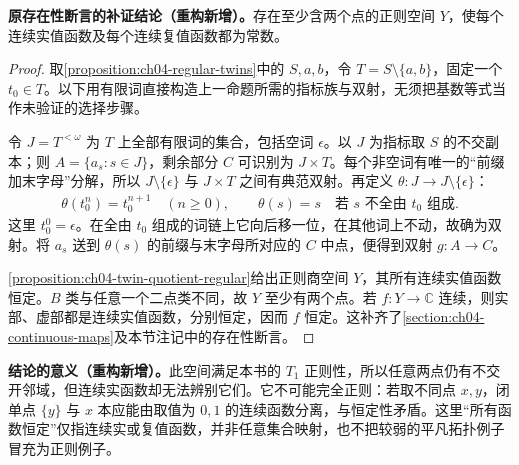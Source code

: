 \documentclass[../../main.tex]{subfiles}
\begin{document}
\begin{corollary}\label{corollary:ch04-regular-only-constant}
\textbf{原存在性断言的补证结论（重构新增）。}存在至少含两个点的正则空间 $Y$，使每个连续实值函数及每个连续复值函数都为常数。
\end{corollary}
\begin{proof}
取\cref{proposition:ch04-regular-twins}中的 $S,a,b$，令 $T=S\setminus\{a,b\}$，固定一个 $t_0\in T$。以下用有限词直接构造上一命题所需的指标族与双射，无须把基数等式当作未验证的选择步骤。

令 $J=T^{<\omega}$ 为 $T$ 上全部有限词的集合，包括空词 $\epsilon$。以 $J$ 为指标取 $S$ 的不交副本；则 $A=\{a_s:s\in J\}$，剩余部分 $C$ 可识别为 $J\times T$。每个非空词有唯一的“前缀加末字母”分解，所以 $J\setminus\{\epsilon\}$ 与 $J\times T$ 之间有典范双射。再定义 $\theta:J\to J\setminus\{\epsilon\}$：
\begin{align*}
\theta(t_0^n)=t_0^{n+1}\quad(n\ge0),\qquad
\theta(s)=s\quad\text{若 }s\text{ 不全由 }t_0\text{ 组成}.
\end{align*}
这里 $t_0^0=\epsilon$。在全由 $t_0$ 组成的词链上它向后移一位，在其他词上不动，故确为双射。将 $a_s$ 送到 $\theta(s)$ 的前缀与末字母所对应的 $C$ 中点，便得到双射 $g:A\to C$。

\cref{proposition:ch04-twin-quotient-regular}给出正则商空间 $Y$，其所有连续实值函数恒定。$B$ 类与任意一个二点类不同，故 $Y$ 至少有两个点。若 $f:Y\to\mathbb C$ 连续，则实部、虚部都是连续实值函数，分别恒定，因而 $f$ 恒定。这补齐了\cref{section:ch04-continuous-maps}及本节注记中的存在性断言。
\end{proof}
\begin{remark}
\textbf{结论的意义（重构新增）。}此空间满足本书的 $T_1$ 正则性，所以任意两点仍有不交开邻域，但连续实函数却无法辨别它们。它不可能完全正则：若取不同点 $x,y$，闭单点 $\{y\}$ 与 $x$ 本应能由取值为 $0,1$ 的连续函数分离，与恒定性矛盾。这里“所有函数恒定”仅指连续实或复值函数，并非任意集合映射，也不把较弱的平凡拓扑例子冒充为正则例子。
\end{remark}
\end{document}
